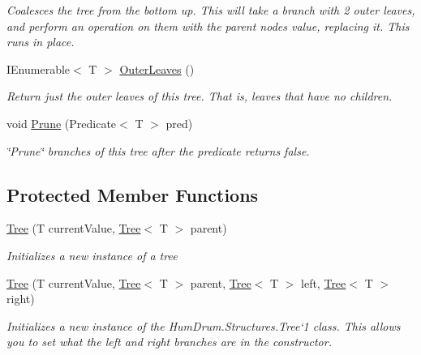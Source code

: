 \begin{DoxyCompactItemize}
\begin{DoxyCompactList}\small\item\em Coalesces the tree from the bottom up. This will take a branch with 2 outer leaves, and perform an operation on them with the parent node\textquotesingle{}s value, replacing it. This runs in place. \end{DoxyCompactList}\item 
I\+Enumerable$<$ T $>$ \hyperlink{classHumDrum_1_1Structures_1_1Tree_adb6de2d167c7d67d05a7e051937587ed}{Outer\+Leaves} ()
\begin{DoxyCompactList}\small\item\em Return just the outer leaves of this tree. That is, leaves that have no children. \end{DoxyCompactList}\item 
void \hyperlink{classHumDrum_1_1Structures_1_1Tree_a0cdb68fb23ac6a3c144fa112c5d168ff}{Prune} (Predicate$<$ T $>$ pred)
\begin{DoxyCompactList}\small\item\em \char`\"{}\+Prune\char`\"{} branches of this tree after the predicate returns false. \end{DoxyCompactList}\end{DoxyCompactItemize}
\subsection*{Protected Member Functions}
\begin{DoxyCompactItemize}
\item 
\hyperlink{classHumDrum_1_1Structures_1_1Tree_a046ae0a9327942fcaa6df370e673b1cb}{Tree} (T current\+Value, \hyperlink{classHumDrum_1_1Structures_1_1Tree}{Tree}$<$ T $>$ parent)
\begin{DoxyCompactList}\small\item\em Initializes a new instance of a tree \end{DoxyCompactList}\item 
\hyperlink{classHumDrum_1_1Structures_1_1Tree_a9a5d6144c80aa77a0cd8e96d660b57a1}{Tree} (T current\+Value, \hyperlink{classHumDrum_1_1Structures_1_1Tree}{Tree}$<$ T $>$ parent, \hyperlink{classHumDrum_1_1Structures_1_1Tree}{Tree}$<$ T $>$ left, \hyperlink{classHumDrum_1_1Structures_1_1Tree}{Tree}$<$ T $>$ right)
\begin{DoxyCompactList}\small\item\em Initializes a new instance of the Hum\+Drum.\+Structures.\+Tree`1 class. This allows you to set what the left and right branches are in the constructor. \end{DoxyCompactList}\end{DoxyCompactItemize}
